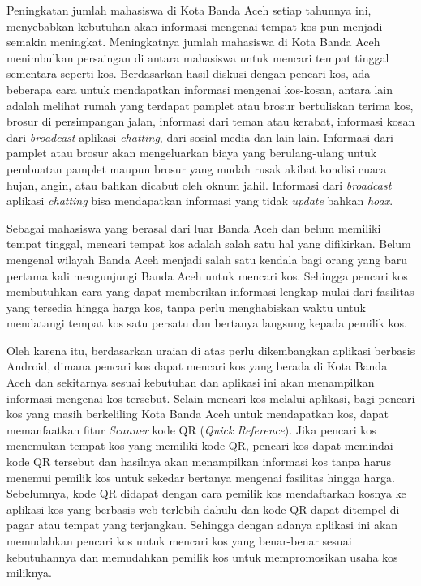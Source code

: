 Peningkatan jumlah mahasiswa di Kota Banda Aceh setiap tahunnya ini, menyebabkan kebutuhan akan informasi mengenai tempat kos pun menjadi semakin meningkat. Meningkatnya jumlah mahasiswa di Kota Banda Aceh menimbulkan persaingan di antara mahasiswa untuk mencari tempat tinggal sementara seperti kos. Berdasarkan hasil diskusi dengan pencari kos, ada beberapa cara untuk mendapatkan informasi mengenai kos-kosan, antara lain adalah melihat rumah yang terdapat pamplet atau brosur bertuliskan terima kos, brosur di persimpangan jalan, informasi dari teman atau kerabat, informasi kosan dari \textit{broadcast} aplikasi \textit{chatting}, dari sosial media dan lain-lain. Informasi dari pamplet atau brosur akan mengeluarkan biaya yang berulang-ulang untuk pembuatan pamplet maupun brosur yang mudah rusak akibat kondisi cuaca hujan, angin, atau bahkan dicabut oleh oknum jahil.  Informasi dari \textit{broadcast} aplikasi \textit{chatting} bisa mendapatkan informasi yang tidak \textit{update} bahkan \textit{hoax}. 

Sebagai mahasiswa yang berasal dari luar Banda Aceh dan belum memiliki tempat tinggal, mencari tempat kos adalah salah satu hal yang difikirkan. Belum mengenal wilayah Banda Aceh menjadi salah satu kendala bagi orang yang baru pertama kali mengunjungi Banda Aceh untuk mencari kos. Sehingga pencari kos membutuhkan cara yang dapat memberikan informasi lengkap mulai dari fasilitas yang tersedia hingga harga kos, tanpa perlu menghabiskan waktu untuk mendatangi tempat kos satu persatu dan bertanya langsung kepada pemilik kos. 

Oleh karena itu, berdasarkan uraian di atas perlu dikembangkan aplikasi berbasis Android, dimana pencari kos dapat mencari kos yang berada di Kota Banda Aceh dan sekitarnya sesuai kebutuhan dan aplikasi ini akan menampilkan informasi mengenai kos tersebut. Selain mencari kos melalui aplikasi, bagi pencari kos yang masih berkeliling Kota Banda Aceh untuk mendapatkan kos, dapat memanfaatkan fitur \textit{Scanner} kode QR (\textit{Quick Reference}). Jika pencari kos menemukan tempat kos yang memiliki kode QR, pencari kos dapat memindai kode QR tersebut dan hasilnya akan menampilkan informasi kos tanpa harus menemui pemilik kos untuk sekedar bertanya mengenai fasilitas hingga harga. Sebelumnya, kode QR didapat dengan cara pemilik kos mendaftarkan kosnya ke aplikasi kos yang berbasis web terlebih dahulu dan kode QR dapat ditempel di pagar atau tempat yang terjangkau. Sehingga dengan adanya aplikasi ini akan memudahkan pencari kos untuk mencari kos yang benar-benar sesuai kebutuhannya dan memudahkan pemilik kos untuk mempromosikan usaha kos miliknya.



